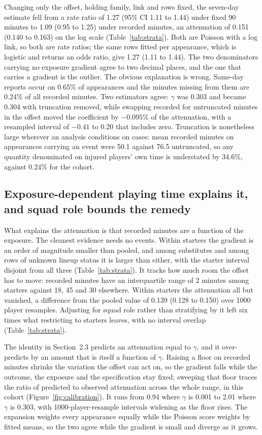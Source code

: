 \documentclass[11pt]{article}
\begin{document}
Changing only the offset, holding family, link and rows fixed, the seven-day estimate fell from a rate ratio of 1.27 (95\% CI 1.11 to 1.44) under fixed 90 minutes to 1.09 (0.95 to 1.25) under recorded minutes, an attenuation of 0.151 (0.140 to 0.163) on the log scale (Table~\ref{tab:strata}). Both are Poisson with a log link, so both are rate ratios; the same rows fitted per appearance, which is logistic and returns an odds ratio, give 1.27 (1.11 to 1.44). The two denominators carrying no exposure gradient agree to two decimal places, and the one that carries a gradient is the outlier. The obvious explanation is wrong. Same-day reports occur on 0.65\% of appearances and the minutes missing from them are 0.24\% of all recorded minutes. Two estimators agree: $\gamma$ was 0.303 and became 0.304 with truncation removed, while swapping recorded for untruncated minutes in the offset moved the coefficient by $-0.095\%$ of the attenuation, with a resampled interval of $-0.41$ to 0.20 that includes zero. Truncation is nonetheless large wherever an analysis conditions on cases: mean recorded minutes on appearances carrying an event were 50.1 against 76.5 untruncated, so any quantity denominated on injured players' own time is understated by 34.6\%, against 0.24\% for the cohort.

\subsection{Exposure-dependent playing time explains it, and squad role bounds the remedy}

What explains the attenuation is that recorded minutes are a function of the exposure. The cleanest evidence needs no events. Within starters the gradient is an order of magnitude smaller than pooled, and among substitutes and among rows of unknown lineup status it is larger than either, with the starter interval disjoint from all three (Table~\ref{tab:strata}). It tracks how much room the offset has to move: recorded minutes have an interquartile range of 2 minutes among starters against 18, 45 and 30 elsewhere. Within starters the attenuation all but vanished, a difference from the pooled value of 0.139 (0.128 to 0.150) over 1000 player resamples. Adjusting for squad role rather than stratifying by it left six times what restricting to starters leaves, with no interval overlap (Table~\ref{tab:strata}).

The identity in Section~2.3 predicts an attenuation equal to $\gamma$, and it over-predicts by an amount that is itself a function of $\gamma$. Raising a floor on recorded minutes shrinks the variation the offset can act on, so the gradient falls while the outcome, the exposure and the specification stay fixed; sweeping that floor traces the ratio of predicted to observed attenuation across the whole range, in this cohort (Figure~\ref{fig:calibration}). It runs from 0.94 where $\gamma$ is 0.001 to 2.01 where $\gamma$ is 0.303, with 1000-player-resample intervals widening as the floor rises. The expansion weights every appearance equally while the Poisson score weights by fitted means, so the two agree while the gradient is small and diverge as it grows.
\end{document}
